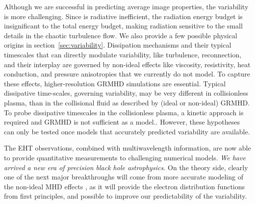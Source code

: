 Although we are successful in predicting average image properties, the
variability is more challenging.
Since \sgra is radiative inefficient, the radiation energy budget is
insignificant to the total energy budget, making radiation sensitive
to the small details in the chaotic turbulence flow.
We also provide a few possible physical origins in
section~\ref{sec:variability}. {Dissipation mechanisms and their typical timescales that can directly modulate variability, like turbulence, reconnection, and their interplay are governed by non-ideal effects like viscosity, resistivity, heat conduction, and pressure anisotropies that we currently do not model. To capture these effects, higher-resolution GRMHD simulations are essential.}
{Typical dissipative time-scales, governing variability, may be very different in collisionless plasma, than in the collisional fluid as described by (ideal or non-ideal) GRMHD. To probe dissipative timescales in the collisionless plasma, a kinetic approach is required and GRMHD is not sufficient as a model.}.
However, these hypotheses can only be tested once models that
accurately predicted variability are available.

The EHT observations, combined with multiwavelength information, are
now able to provide quantitative measurements to challenging numerical
models.
\emph{We have arrived a new era of precision black hole astrophysics.}
On the theory side, clearly one of the next major breakthroughs will
come from {more} accurate modeling of the non-ideal MHD effects , as it will
provide the electron distribution functions from first principles, and
possible to improve our predictability of the variability.